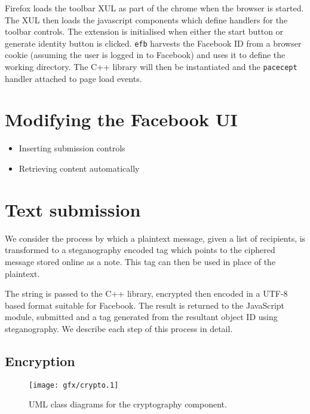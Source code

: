 Firefox loads the toolbar XUL as part of the chrome when the browser is started. The XUL then loads the javascript components which define handlers for the toolbar controls. The extension is initialised when either the start button or generate identity button is clicked. {\tt efb} harvests the Facebook ID from a browser cookie (assuming the user is logged in to Facebook) and uses it to define the working directory. The C++ library will then be instantiated and the {\tt pacecept} handler attached to page load events.


\FloatBarrier
\section{Modifying the Facebook UI}
    \begin{itemize}
        \item Inserting submission controls
        \item Retrieving content automatically
    \end{itemize}
    
    
\FloatBarrier
\section{Text submission}

We consider the process by which a plaintext message, given a list of recipients, is transformed to a steganography encoded tag which points to the ciphered message stored online as a note. This tag can then be used in place of the plaintext.

The string is passed to the C++ library, encrypted then encoded in a UTF-8 based format suitable for Facebook. The result is returned to the JavaScript module, submitted and a tag generated from the resultant object ID using steganography. We describe each step of this process in detail.

\FloatBarrier
\subsection{Encryption}


    \begin{figure}[tb]
        \begin{center}
                \texttt{[image: gfx/crypto.1]}
            \caption{UML class diagrams for the cryptography component.}
            \label{uml:crypto}
        \end{center}
    \end{figure}
    
